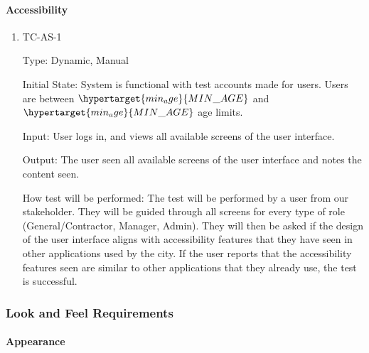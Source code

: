 \documentclass[12pt, titlepage]{article}
\begin{document}
\paragraph{Accessibility}
\begin{enumerate}
  \item{TC-AS-1\\}

    Type: Dynamic, Manual

    Initial State: System is functional with test accounts made for users. Users
    are between $\hypertarget{min_age}{MIN\_AGE}$ and
    $\hypertarget{min_age}{MIN\_AGE}$ age limits.

    Input: User logs in, and views all available screens of the user interface.

    Output: The user seen all available screens of
    the user interface and notes the content seen.

    How test will be performed: The test will be performed by a user from our
    stakeholder. They will be guided through all screens for every type of role
    (General/Contractor, Manager, Admin). They will then be asked if the design
    of the user interface aligns with accessibility features that they have
    seen in other applications used by the city. If the user reports that the
    accessibility features seen are similar to other applications that
    they already use, the test is successful.

\end{enumerate}

\subsubsection{Look and Feel Requirements}

\paragraph{Appearance}
\end{document}

